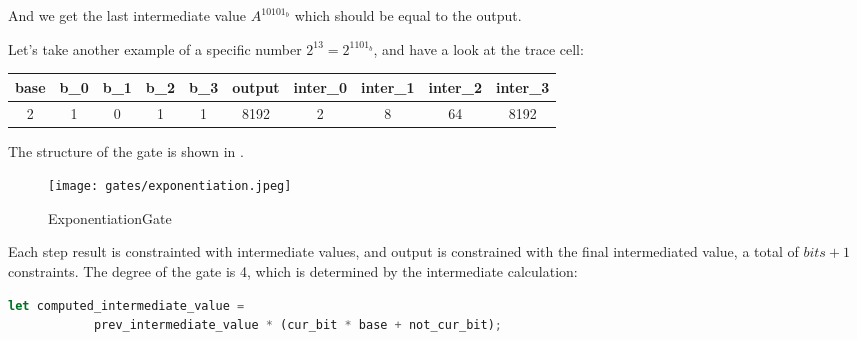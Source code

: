 And we get the last intermediate value $A^{10101_b}$ which should be equal to the output.

Let's take another example of a specific number $2^{13} = 2^{1101_b}$, and have a look at the trace cell:
\begin{center}
    \begin{tabular}{ |c|c|c|c|c|c|c|c|c|c| }
        \hline
        base & b\_0 & b\_1 & b\_2 & b\_3 & output & inter\_0 & inter\_1 & inter\_2 & inter\_3 \\
        \hline
        2 & 1 & 0 & 1 & 1 & 8192 & 2 & 8 & 64 & 8192 \\
        \hline
    \end{tabular}
\end{center}

The structure of the gate is shown in .
\begin{figure}[!ht]
    \centering
    \texttt{[image: gates/exponentiation.jpeg]}
    \caption{ExponentiationGate}
    \label{fig:exponetiation-gate}
\end{figure}

Each step result is constrainted with intermediate values, and output is constrained with the final intermediated value, a total of $bits + 1$ constraints.
The degree of the gate is 4, which is determined by the intermediate calculation:
\begin{lstlisting}[language=rust]
let computed_intermediate_value =
            prev_intermediate_value * (cur_bit * base + not_cur_bit);
\end{lstlisting}
